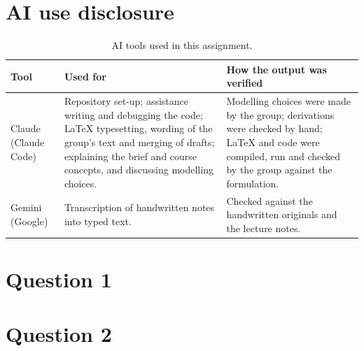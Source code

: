 \documentclass[12pt,oneside,a4paper,english]{article}
\begin{document}
\section*{AI use disclosure}
\begin{table}[H]
  \centering
  \begin{tabularx}{\textwidth}{lXX}
    \toprule
    \textbf{Tool} & \textbf{Used for} & \textbf{How the output was verified} \\
    \midrule
        Claude (Claude Code)
    &
    Repository set-up; assistance writing and debugging the code; LaTeX typesetting, wording of
    the group's text and merging of drafts; explaining the brief and course concepts, and
    discussing modelling choices.
    &
    Modelling choices were made by the group; derivations were checked by hand; LaTeX and code
    were compiled, run and checked by the group against the formulation.
    \\
    \midrule
    Gemini (Google)
    &
    Transcription of handwritten notes into typed text.
    &
    Checked against the handwritten originals and the lecture notes.
    \\
    \bottomrule
  \end{tabularx}
  \caption{AI tools used in this assignment.}
  \label{tab:ai}
\end{table}

\newpage 
{} 



\newpage


\newpage
\section{Question 1}


\newpage
\section{Question 2}

\end{document}
